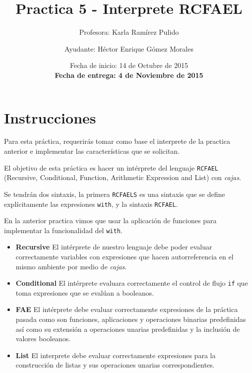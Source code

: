 \documentclass{article}
\author{Profesora: Karla Ramírez Pulido \and
  Ayudante: Héctor Enrique Gómez Morales}
\title{Practica 5 - Interprete RCFAEL}
\date{Fecha de inicio: 14 de Octubre de 2015\\
  \textbf{Fecha de entrega: 4 de Noviembre de 2015}}
\begin{document}
\maketitle
\section{Instrucciones}

Para esta práctica, requerirás tomar como base el interprete de la practica anterior e implementar las características que se solicitan.

El objetivo de esta práctica es hacer un intérprete del lenguaje \texttt{RCFAEL} (Recursive, Conditional, Function, Arithmetic Expression and List) con \emph{cajas}.

Se tendrán dos sintaxis, la primera \texttt{RCFAELS} es una sintaxis que se define explícitamente las expresiones \texttt{with}, y la sintaxis \texttt{RCFAEL}.

En la anterior practica vimos que usar la aplicación de funciones para implementar la funcionalidad del \texttt{with}.

\begin{itemize}
\item \textbf{Recursive} El intérprete de nuestro lenguaje debe poder evaluar correctamente variables con expresiones que hacen autorreferencia en el mismo ambiente por medio de \emph{cajas}.
\item \textbf{Conditional} El intérprete evaluara correctamente el control de flujo \texttt{if} que toma expresiones que se evalúan a booleanos.
\item \textbf{FAE} El intérprete debe evaluar correctamente expresiones de la práctica pasada como son funciones, aplicaciones y operaciones binarias predefinidas así como su extensión a operaciones unarias predefinidas y la inclusión de valores booleanos.
\item \textbf{List} El interprete debe evaluar correctamente expresiones para la construcción de listas y sus operaciones unarias correspondientes.
\end{itemize}
\end{document}

